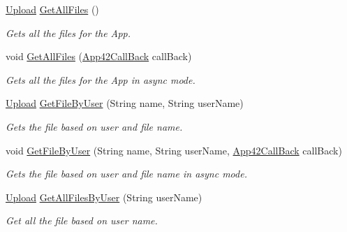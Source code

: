 \begin{DoxyCompactItemize}
\hyperlink{classcom_1_1shephertz_1_1app42_1_1paas_1_1sdk_1_1csharp_1_1upload_1_1_upload}{Upload} \hyperlink{classcom_1_1shephertz_1_1app42_1_1paas_1_1sdk_1_1csharp_1_1upload_1_1_upload_service_abcad44db029f336a75c698b688b499df}{Get\+All\+Files} ()
\begin{DoxyCompactList}\small\item\em Gets all the files for the App. \end{DoxyCompactList}\item 
void \hyperlink{classcom_1_1shephertz_1_1app42_1_1paas_1_1sdk_1_1csharp_1_1upload_1_1_upload_service_a34862f51a2c746ffa96d055f3b299413}{Get\+All\+Files} (\hyperlink{interfacecom_1_1shephertz_1_1app42_1_1paas_1_1sdk_1_1csharp_1_1_app42_call_back}{App42\+Call\+Back} call\+Back)
\begin{DoxyCompactList}\small\item\em Gets all the files for the App in async mode. \end{DoxyCompactList}\item 
\hyperlink{classcom_1_1shephertz_1_1app42_1_1paas_1_1sdk_1_1csharp_1_1upload_1_1_upload}{Upload} \hyperlink{classcom_1_1shephertz_1_1app42_1_1paas_1_1sdk_1_1csharp_1_1upload_1_1_upload_service_af3425859599ee2c19ace433550a8a072}{Get\+File\+By\+User} (String name, String user\+Name)
\begin{DoxyCompactList}\small\item\em Gets the file based on user and file name. \end{DoxyCompactList}\item 
void \hyperlink{classcom_1_1shephertz_1_1app42_1_1paas_1_1sdk_1_1csharp_1_1upload_1_1_upload_service_a93efc3f6d75591c6094f5d8c0504eeab}{Get\+File\+By\+User} (String name, String user\+Name, \hyperlink{interfacecom_1_1shephertz_1_1app42_1_1paas_1_1sdk_1_1csharp_1_1_app42_call_back}{App42\+Call\+Back} call\+Back)
\begin{DoxyCompactList}\small\item\em Gets the file based on user and file name in async mode. \end{DoxyCompactList}\item 
\hyperlink{classcom_1_1shephertz_1_1app42_1_1paas_1_1sdk_1_1csharp_1_1upload_1_1_upload}{Upload} \hyperlink{classcom_1_1shephertz_1_1app42_1_1paas_1_1sdk_1_1csharp_1_1upload_1_1_upload_service_a78282c700e1f01f042cc3faff1c3490d}{Get\+All\+Files\+By\+User} (String user\+Name)
\begin{DoxyCompactList}\small\item\em Get all the file based on user name. \end{DoxyCompactList}\item 

\end{DoxyCompactItemize}
